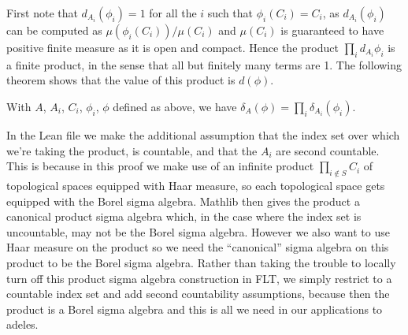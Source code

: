 First note that $d_{A_i}(\phi_i)=1$ for all the $i$ such that $\phi_i(C_i)=C_i$, as
$d_{A_i}(\phi_i)$ can be computed as $\mu(\phi_i(C_i))/\mu(C_i)$ and $\mu(C_i)$ is
guaranteed to have positive finite measure as it is open and compact. Hence the product
$\prod_id_{A_i}\phi_i$ is a finite product, in the sense that all but finitely many terms are 1.
The following theorem shows that the value of this product is $d(\phi)$.

\begin{theorem}
  \label{MeasureTheory.addEquivAddHaarChar_restrictedProductCongrRight}
  \leanok
  With $A$, $A_i$, $C_i$, $\phi_i$, $\phi$ defined as above, we have
  $\delta_A(\phi)=\prod_i\delta_{A_i}(\phi_i)$.
\end{theorem}
\begin{remark} In the Lean file we make the additional assumption that the index set over
  which we're taking the product, is countable, and that the $A_i$ are second countable.
  This is because in this proof we make use
  of an infinite product $\prod_{i\notin S}C_i$ of topological spaces equipped with Haar measure,
  so each topological space gets equipped with the Borel sigma algebra.
  Mathlib then gives the product a canonical product sigma algebra which, in the case where the
  index set is uncountable, may not be the Borel sigma algebra. However we also want to use Haar
  measure on the product so we need the ``canonical'' sigma algebra on this product to be the
  Borel sigma algebra. Rather than taking the trouble
  to locally turn off this product sigma algebra construction in FLT, we simply restrict to a
  countable index set and add second countability assumptions, because then the product is a
  Borel sigma algebra and this is all we need in our applications to adeles.
\end{remark}
